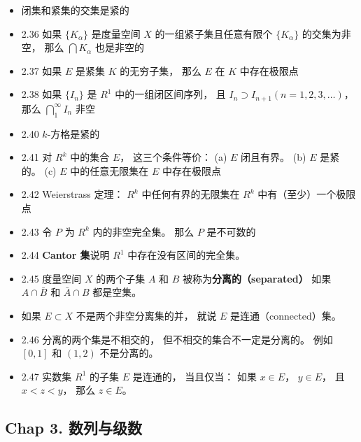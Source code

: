 \begin{itemize}
\item 闭集和紧集的交集是紧的

\item 2.36 如果 $\{K_\alpha\}$ 是度量空间 $X$ 的一组紧子集且任意有限个 $\{K_\alpha\}$ 的交集为非空， 那么 $\bigcap K_\alpha$ 也是非空的

\item 2.37 如果 $E$ 是紧集 $K$ 的无穷子集， 那么 $E$ 在 $K$ 中存在极限点

\item 2.38 如果 $\{I_n\}$ 是 $R^1$ 中的一组闭区间序列， 且 $I_n \supset I_{n+1} (n = 1, 2, 3,\dots)$， 那么 $\bigcap_1^\infty I_n$ 非空

\item 2.40 $k$-方格是紧的

\item 2.41 对 $R^k$ 中的集合 $E$， 这三个条件等价： (a) $E$ 闭且有界。 (b) $E$ 是紧的。 (c) $E$ 中的任意无限集在 $E$ 中存在极限点

\item 2.42 Weierstrass 定理： $R^k$ 中任何有界的无限集在 $R^k$ 中有（至少）一个极限点

\item 2.43 令 $P$ 为 $R^k$ 内的非空完全集。 那么 $P$ 是不可数的

\item 2.44 \textbf{Cantor 集}说明 $R^1$ 中存在没有区间的完全集。

\item 2.45 度量空间 $X$ 的两个子集 $A$ 和 $B$ 被称为\textbf{分离的（separated）} 如果 $A \cap \bar B$ 和 $\bar A \cap B$ 都是空集。

\item 如果 $E \subset X$ 不是两个非空分离集的并， 就说 $E$ 是连通（connected）集。

\item 2.46 分离的两个集是不相交的， 但不相交的集合不一定是分离的。 例如 $[0,1]$ 和 $(1,2)$ 不是分离的。

\item 2.47 实数集 $R^1$ 的子集 $E$ 是连通的， 当且仅当： 如果 $x\in E$， $y\in E$， 且 $x < z < y$， 那么 $z \in E$。
\end{itemize}

\subsection{Chap 3. 数列与级数}


